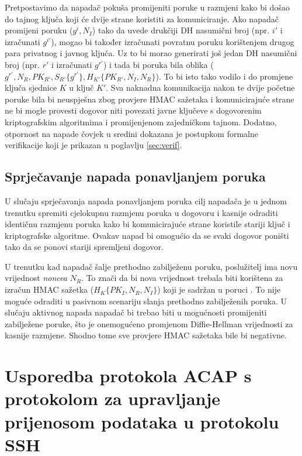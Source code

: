 Pretpostavimo da
napadač pokuša promijeniti poruke u razmjeni kako bi došao do tajnog ključa koji
će dvije strane koristiti za komuniciranje. Ako napadač promijeni poruku \initi{}
($g^i,N_I$) tako da uvede drukčiji DH nasumični broj (npr. $i'$ i
izračunati $g^{i'}$),
mogao bi također izračunati povratnu \initr{} poruku korištenjem drugog para
privatnog i javnog ključa. Uz to bi morao generirati još jedan DH nasumični broj
(npr. $r'$ i izračunati $g^{r'}$) i tada bi poruka \initr{} 
bila oblika ($g^{r'}, N_R, PK_{R'}, S_{R'}\{g^{r'}\},
H_{K'}\{PK_{R'}, N_I, N_R\}$). To bi isto tako vodilo i do promjene ključa
sjednice $K$ u ključ $K'$. Sva naknadna komunikacija nakon te dvije početne
poruke bila bi neuspješna zbog provjere HMAC sažetaka i komunicirajuće strane ne
bi mogle provesti dogovor niti povezati javne ključeve s dogovorenim
kriptografskim algoritmima i promijenjenom zajedničkom tajnom. Dodatno,
otpornost na napade čovjek u sredini dokazana je postupkom formalne
verifikacije koji je prikazan u poglavlju \ref{sec:verif}.

\subsection{Sprječavanje napada ponavljanjem poruka}
\label{sec:replay}
U slučaju sprječavanja napada ponavljanjem poruka cilj napadača
je u jednom trenutku spremiti cjelokupnu razmjenu poruka u dogovoru i kasnije
odraditi identičnu razmjenu poruka kako bi komunicirajuće strane koristile
stariji ključ i kriptografske algoritme. Ovakav napad bi omogućio da se svaki
dogovor poništi tako da se ponovi stariji spremljeni dogovor.

U trenutku kad napadač šalje prethodno zabilježenu poruku, poslužitelj ima novu
vrijednost \emph{noncea} $N_R$. To znači da bi nova vrijednost trebala biti
korištena za izračun HMAC sažetka ($H_K\{PK_I, N_R, N_I\}$) koji je sadržan u
poruci \listi{}. To nije moguće odraditi u pasivnom scenariju slanja prethodno
zabilježenih poruka. U slučaju aktivnog napada napadač bi trebao biti u
mogućnosti promijeniti zabilježene poruke, što je onemogućeno promjenom
Diffie-Hellman vrijednosti za kasnije razmjene. Shodno tome sve provjere HMAC
sažetaka bile bi negativne.

\section{Usporedba protokola ACAP s protokolom za upravljanje prijenosom
podataka u protokolu SSH}

